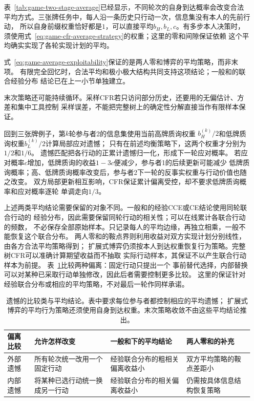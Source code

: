 表~\ref{tab:game-two-stage-average}已经显示，不同轮次的自身到达概率会改变合法
平均方式。三张牌任务中，每人沿一条历史只行动一次，信息集没有本人的先前行动，
所以自身前缀权重恰好都是\(1\)，可以直接平均\(b_H,b_L,c\)。有多步本人决策时，
须使用式~\eqref{eq:game-cfr-average-strategy}的权重；这里的零和间隙保证依赖
这个平均确实实现了各轮实现计划的平均。

式~\eqref{eq:game-average-exploitability}保证的是两人零和博弈的平均策略，而非末项。
有限完全回忆时，合法平均和极小极大结构共同支持这项结论；一般和的联合经验分布
结论已在上一小节单独建立。

末次策略还可能持续循环。采样CFR若只访问部分历史，还要用的无偏估计、方差和集中工具控制
采样误差，不能把完整树上的确定性分解直接当作有限样本保证。

回到三张牌例子，第\(k\)轮参与者2的信息集使用当前高牌质询权重
\(b_H^{(k)}/2\)和低牌质询权重\(b_L^{(k)}/2\)计算局部应对遗憾；
只有在前述均衡策略下，这两个权重才分别为\(1/2\)和\(1/6\)。
遗憾匹配把各行动的正累计遗憾归一化，形成下一轮应对概率。
若应对概率\(c\)增加，低牌质询的收益\(1-3c\)便减少，参与者1的后续更新可能减少
低牌质询概率；高、低牌质询概率改变后，参与者2下一轮的反事实权重与行动价值也随之改变。
双方局部更新相互影响，CFR保证累计偏离受控，却不要求低牌质询概率和应对概率逐轮
单调走向\(1/3\)。

上述两类平均结论需要保留的对象不同。一般和的经验CCE或CE结论使用同轮联合行动的
经验分布，因此需要保留同轮行动的相关性；可以在线累计各联合行动的频数，
不必保存全部原始样本。只记录每人的平均边缘，再独立相乘，一般不能恢复这个联合分布。
两人零和的鞍点界则利用收益对双方实现计划分别线性，由各方合法平均策略得到；
扩展式博弈仍须按本人到达权重恢复行为策略。完整树CFR可以准确计算期望收益而不抽取
实际行动样本，其保证不以产生联合行动样本为前提。
表~\ref{tab:game-regret-comparison-conclusions}比较两种偏离：固定行动只提出一个
事前替代选择，内部替换可以对某种已采取行动单独修改，因此后者需要控制更多比较。
这里的保证针对经验联合分布或相应的平均策略，不对最后一轮作同样承诺。

\begin{table}[htbp]
  \centering
  \begin{tabularx}{\linewidth}{lXXX}
    \toprule
    偏离比较 & 允许怎样改变 & 一般和下的平均结论 & 两人零和的补充\\
    \midrule
    外部遗憾 & 所有轮次统一改用一个固定行动 & 经验联合分布的粗相关偏离收益小 & 双方平均策略的鞍点差距小\\
    内部遗憾 & 将某种已选行动统一换成另一行动 & 经验联合分布的相关偏离收益小 & 仍需按具体信息结构恢复策略\\
    \bottomrule
  \end{tabularx}
  \caption{遗憾的比较类与平均结论。表中要求每位参与者都控制相应的平均遗憾；
  扩展式博弈的平均行为策略还须使用自身到达权重。末次策略收敛不由这些平均结论推出。}
  \label{tab:game-regret-comparison-conclusions}
\end{table}

